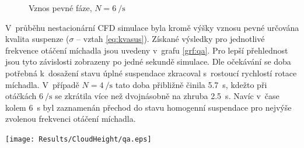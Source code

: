 \begin{figure}[h!]
 \centering
  \qquad 
  \caption{Vznos pevné fáze, $N=\SI{6}{\per\second}$}
  \label{fig:h-w10-6s}
\end{figure}
\newpage

V~průběhu nestacionární CFD simulace byla kromě výšky vznosu pevné určována kvalita suspenze ($\sigma$ -- vztah \ref{eq:kvasus}). Získané výsledky pro jednotlivé frekvence otáčení míchadla jsou uvedeny v~grafu \ref{grf:qa}. Pro lepší přehlednost jsou tyto závislosti zobrazeny po jedné sekundě simulace. Dle očekávání se doba potřebná k~dosažení stavu úplné suspendace zkracoval s~rostoucí rychlostí rotace míchadla. V~případě $N=\SI{4}{\per\second}$ tato doba přibližně činila \SI{5.7}{\second}, kdežto při otáčkách $\SI{6}{\per\second}$ se zkrátila více než dvojnásobně na zhruba \SI{2.5}{\second}. Navíc v~čase kolem \SI{6}{\second} byl zaznamenán přechod do stavu homogenní suspendace pro nejvýše zvolenou frekvenci otáčení míchadla. 

\begin{grf}[h!]
 \centering
  \texttt{[image: Results/CloudHeight/qa.eps]}
  \caption{Průběh kvality suspenze}
  \label{grf:qa}
\end{grf}


